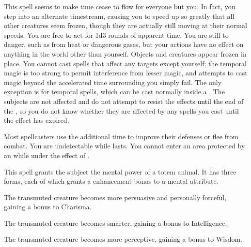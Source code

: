 \begin{spelleffect}
  This spell seems to make time cease to flow for everyone but you. In fact, you step into an alternate timestream, causing you to speed up so greatly that all other creatures seem frozen, though they are actually still moving at their normal speeds. You are free to act for 1d3 rounds of apparent time. You are still \vulnerable to danger, such as from heat or dangerous gases, but your actions have no effect on anything in the world other than yourself. Objects and creatures appear frozen in place. You cannot cast spells that affect any targets except yourself; the temporal magic is too strong to permit interference from lesser magic, and attempts to cast magic beyond the accelerated time surrounding you simply fail. The only exception is for temporal spells, which can be cast normally inside a . The subjects are not affected and do not attempt to resist the effects until the end of the , so you do not know whether they are affected by any spells you cast until the effect has expired.
\end{spelleffect}
\begin{spellnotes}
  Most spellcasters use the additional time to improve their defenses or flee from combat. You are undetectable while  lasts. You cannot enter an area protected by an  while under the effect of .
\end{spellnotes}

\spellrng{\rngtouch}
\spelldur{\durshort}
\begin{spelleffect}
  This spell grants the subject the mental power of a totem animal. It has three forms, each of which grants a  enhancement bonus to a mental attribute.
  \par {} The transmuted creature becomes more persuasive and personally forceful, gaining a bonus to Charisma.
  \par {} The transmuted creature becomes smarter, gaining a bonus to Intelligence.
  \par {} The transmuted creature becomes more perceptive, gaining a bonus to Wisdom.
\end{spelleffect}

